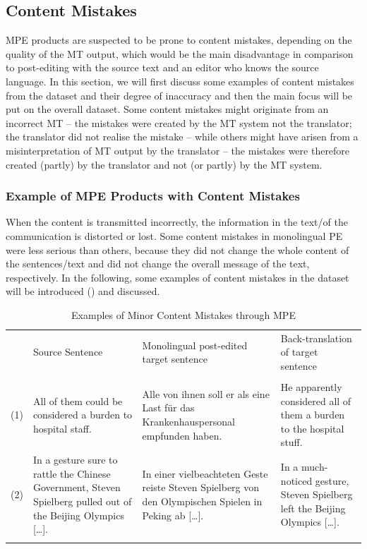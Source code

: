 \documentclass[output=paper]{langsci/langscibook}
\begin{document}
\subsection{Content Mistakes}

MPE products are suspected to be prone to content mistakes, depending on the quality of the MT output, which would be the main disadvantage in comparison to post-editing with the source text and an editor who knows the source language. In this section, we will first discuss some examples of content mistakes from the dataset and their degree of inaccuracy and then the main focus will be put on the overall dataset. Some content mistakes might originate from an incorrect MT – the mistakes were created by the MT system not the translator; the translator did not realise the mistake – while others might have arisen from a misinterpretation of MT output by the translator – the mistakes were therefore created (partly) by the translator and not (or partly) by the MT system.

\subsubsection{ Example of MPE Products with Content Mistakes}

When the content is transmitted incorrectly, the information in the text/of the communication is distorted or lost. Some content mistakes in monolingual PE were less serious than others, because they did not change the whole content of the sentences/text and did not change the overall message of the text, respectively. In the following, some examples of content mistakes in the dataset will be introduced () and discussed.

\begin{table}
\begin{tabularx}{\textwidth}{lXXX} 
    & Source Sentence & Monolingual post-edited target sentence & Back-translation of target sentence \\
\lsptoprule
\multicolumn{3}{l}{Minor content mistakes}\\
(1) & All of them could be considered a burden to hospital staff. & Alle von ihnen soll er als eine Last für das Krankenhauspersonal empfunden haben. & He apparently considered all of them a burden to the hospital stuff.\\
(2)	& In a gesture sure to rattle the Chinese Government, Steven Spielberg pulled out of the Beijing Olympics […]. & In einer vielbeachteten Geste reiste Steven Spielberg von den Olympischen Spielen in Peking ab […]. & In a much-noticed gesture, Steven Spielberg left the Beijing Olympics […].\\
\lspbottomrule
\end{tabularx}
\caption{Examples of Minor Content Mistakes through MPE}
\label{tab:nitzke:1a}
\end{table}
\end{document}
